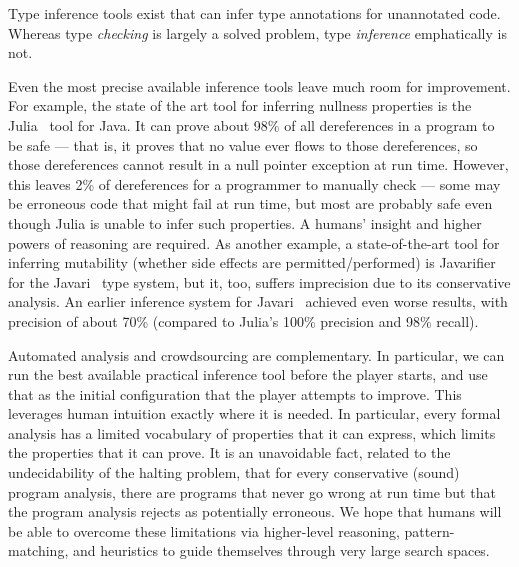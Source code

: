 \documentclass[preprint]{sig-alternate}
\def\<#1>{\codeid{#1}}
\newcommand{\codeid}[1]{\ifmmode{\mbox{\ttfamily{#1}}}\else{\ttfamily #1}\fi}
\newcommand{\todo}[1]{\relax}
\begin{document}
Type inference tools exist that can infer type annotations for unannotated
code.  Whereas type \emph{checking} is largely a solved problem, type
\emph{inference} emphatically is not.

\todo{Move this paragraph somewhere. Maybe related work?}
Even the most precise available inference tools leave much room for
improvement.  For example, the state of the art tool for inferring
nullness properties is the
Julia~\cite{julia-web-interface,Spoto2008,Spoto10:LPAR,Spoto10,SpotoE2011}
tool for Java.  It can prove about 98\% of all dereferences in a
program to be safe --- that is, it proves that no \<null> value ever
flows to those dereferences, so those dereferences cannot result in a
null pointer exception at run time.  However, this leaves 2\% of
dereferences for a programmer to manually check --- some may be
erroneous code that might fail at run time, but most are probably safe
even though Julia is unable to infer such properties.  A humans'
insight and higher powers of reasoning are required.  As another
example, a state-of-the-art tool for inferring mutability (whether
side effects are permitted/performed) is
Javarifier~\cite{Quinonez2008,QuinonezTE2008} for the
Javari~\cite{BirkaE2004,TschantzE2005,Tschantz2006} type system, but
it, too, suffers imprecision due to its conservative analysis.  An
earlier inference system for
Javari~\cite{GreenfieldboyceF2005,GreenfieldboyceF2007} achieved even
worse results, with precision of about 70\% (compared to Julia's 100\%
precision and 98\% recall).


Automated analysis and crowdsourcing are complementary.  In
particular, we can run the best available practical inference tool
before the player starts, and use that as the initial configuration
that the player attempts to improve.  This leverages human intuition
exactly where it is needed.  In particular, every formal analysis has
a limited vocabulary of properties that it can express, which limits
the properties that it can prove.  It is an unavoidable fact, related
to the undecidability of the halting problem, that for every
conservative (sound) program analysis, there are programs that never
go wrong at run time but that the program analysis rejects as
potentially erroneous.  We hope that humans will be able to overcome
these limitations via higher-level reasoning, pattern-matching, and
heuristics to guide themselves through very large search spaces.

\end{document}
